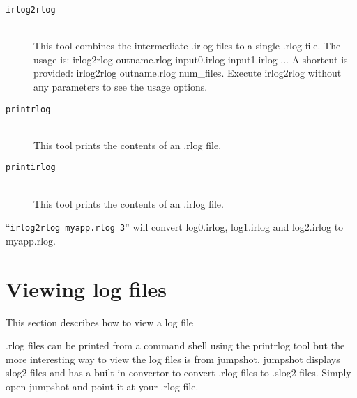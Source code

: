 \documentclass[dvipdfm,11pt]{article}
\begin{document}
\begin{description}
\item[\texttt{irlog2rlog}]\mbox{}\\
This tool combines the intermediate .irlog files to a single .rlog file.
The usage is: irlog2rlog outname.rlog input0.irlog input1.irlog ...
A shortcut is provided: irlog2rlog outname.rlog num\_files.  Execute irlog2rlog
without any parameters to see the usage options.

\item[\texttt{printrlog}]\mbox{}\\
This tool prints the contents of an .rlog file.

\item[\texttt{printirlog}]\mbox{}\\
This tool prints the contents of an .irlog file.
\end{description}

``\texttt{irlog2rlog myapp.rlog 3}'' will convert log0.irlog, log1.irlog and log2.irlog
to myapp.rlog.

\section{Viewing log files}
This section describes how to view a log file

.rlog files can be printed from a command shell using the printrlog tool but
the more interesting way to view the log files is from jumpshot.  jumpshot
displays slog2 files and has a built in convertor to convert .rlog files to
.slog2 files.  Simply open jumpshot and point it at your .rlog file.



\end{document}
